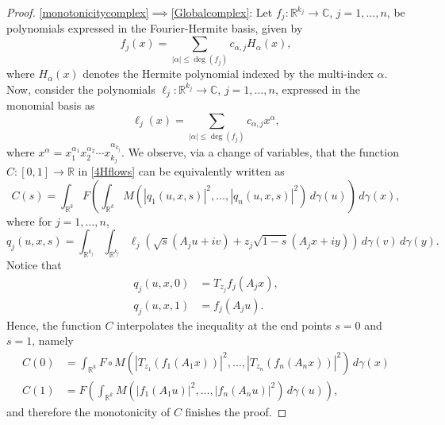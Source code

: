 \documentclass[9pt, a4paper]{amsart}
\newcommand{\R}{\mathbb{R}}
\newcommand{\1}{{\chi_{}}}%
\numberwithin{equation}{section}
\begin{document}
\begin{proof}
\eqref{monotonicitycomplex}$\implies$\eqref{Globalcomplex}:	Let $f_j: \mathbb{R}^{k_j} \to \mathbb{C}$, $j = 1, \ldots, n$, be polynomials expressed in the Fourier-Hermite basis, given by  
\begin{equation*}
	f_j(x) = \sum_{|\alpha| \leq \deg(f_j)} c_{\alpha,j} H_\alpha(x),
\end{equation*}
where $H_\alpha(x)$ denotes the Hermite polynomial indexed by the multi-index $\alpha$.  Now, consider the polynomials $\ell_j: \mathbb{R}^{k_j} \to \mathbb{C}$, $j = 1, \ldots, n$, expressed in the monomial basis as  
\begin{equation*}
	\ell_j(x) = \sum_{|\alpha| \leq \deg(f_j)} c_{\alpha,j} x^\alpha,
\end{equation*}
where $x^\alpha = x_1^{\alpha_1} x_2^{\alpha_2} \cdots x_{k_j}^{\alpha_{k_j}}$.
We observe, via a change of variables, that the function $C:[0,1]\to\R$ in \eqref{4Hflows} can be equivalently written as
\begin{equation*}
	C(s)=\int_{\R^k}F\left(\int_{\R^k}M(|q_1(u,x,s)|^2,\ldots,|q_n(u,x,s)|^2)\,d\gamma(u)\right)\,d\gamma(x),
\end{equation*}
where for $j=1,\ldots,n$,
\begin{equation*}
	q_j(u,x,s)=\int_{\R^{k_j}}\int_{\R^{k_j}}\ell_j(\sqrt{s}(A_j u+iv)+z_j\sqrt{1-s}(A_j x+iy))\,d\gamma(v)\,d\gamma(y).
\end{equation*}
Notice that
\begin{align*}
	q_j(u,x,0)&=T_{z_j}f_j(A_j x),\\
	q_j(u,x,1)&=f_j(A_j u).
\end{align*}
Hence, the function $C$ interpolates the inequality at the end points $s=0$ and $s=1$, namely
\begin{align*}
	C(0)&=	\int_{\R^k}F\circ M(|T_{z_1}(f_1(A_1 x))|^2, \ldots, |T_{z_n}(f_n( A_n x))|^2) \,d\gamma(x)\\
	C(1)&=F\left(	\int_{\R^k}M(|f_1(A_1 u)|^2, \ldots, |f_n(A_n u)|^2)\,d\gamma(u)\right),
\end{align*}
and therefore the monotonicity of $C$ finishes the proof.

	\end{proof}
	
\end{document}

